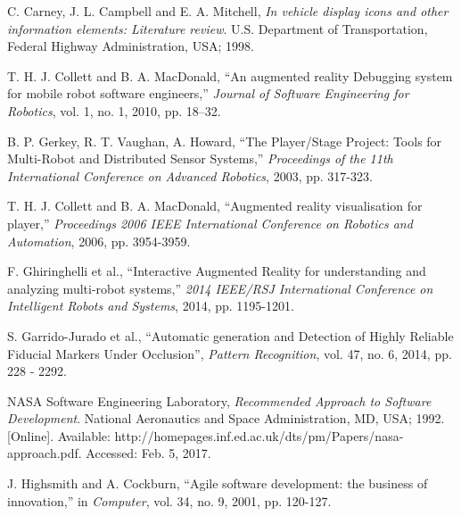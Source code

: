 \documentclass[titlepage,hidelinks,10pt]{article}
\begin{document}
\begin{thebibliography}{1}
 C. Carney, J. L. Campbell and E. A. Mitchell, \textit{In vehicle display icons and other information elements: Literature review}. U.S. Department of Transportation, Federal Highway Administration, USA; 1998.

 T. H. J. Collett and B. A. MacDonald, ``An augmented reality Debugging system for mobile robot software engineers,'' \textit{Journal of Software Engineering for Robotics}, vol. 1, no. 1, 2010, pp. 18–32.

 B. P. Gerkey, R. T. Vaughan, A. Howard, ``The Player/Stage Project: Tools for Multi-Robot and Distributed Sensor Systems,'' \textit{Proceedings of the 11th International Conference on Advanced Robotics}, 2003, pp. 317-323.

 T. H. J. Collett and B. A. MacDonald, ``Augmented reality visualisation for player,'' \textit{Proceedings 2006 IEEE International Conference on Robotics and Automation}, 2006, pp. 3954-3959.

 F. Ghiringhelli et al., ``Interactive Augmented Reality for understanding and analyzing multi-robot systems,'' \textit{2014 IEEE/RSJ International Conference on Intelligent Robots and Systems}, 2014, pp. 1195-1201.

 S. Garrido-Jurado et al., ``Automatic generation and Detection of Highly Reliable Fiducial Markers Under Occlusion'', \textit{Pattern Recognition}, vol. 47, no. 6, 2014, pp. 228 - 2292.

 NASA Software Engineering Laboratory, \textit{Recommended Approach to Software Development}. National Aeronautics and Space Administration, MD, USA; 1992. [Online]. Available: http://homepages.inf.ed.ac.uk/dts/pm/Papers/nasa-approach.pdf. Accessed: Feb. 5, 2017.

 J. Highsmith and A. Cockburn, ``Agile software development: the business of innovation,'' in \textit{Computer}, vol. 34, no. 9, 2001, pp. 120-127.

\end{thebibliography}
\end{document}
